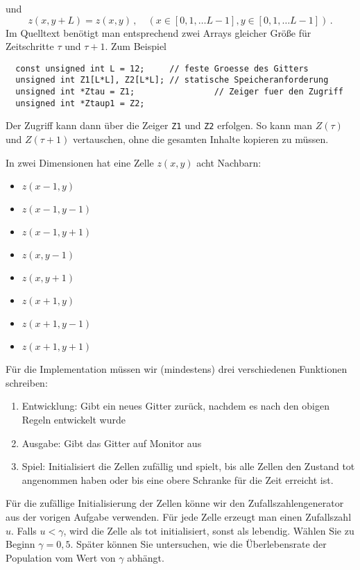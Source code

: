 \documentclass{article}[12pt]
\begin{document}
und
\begin{equation}
  z(x,y+L)= z(x, y)\,,\quad (x\in[0,1,\ldots L-1], y\in[0,1,\ldots L-1])\,.
\end{equation}
Im Quelltext benötigt man entsprechend zwei Arrays gleicher Größe für Zeitschritte $\tau$ und $\tau+1$.
Zum Beispiel
\begin{lstlisting}
  const unsigned int L = 12;     // feste Groesse des Gitters
  unsigned int Z1[L*L], Z2[L*L]; // statische Speicheranforderung
  unsigned int *Ztau = Z1;                // Zeiger fuer den Zugriff
  unsigned int *Ztaup1 = Z2;
\end{lstlisting}
Der Zugriff kann dann über die Zeiger \texttt{Z1} und \texttt{Z2} erfolgen.
So kann man $Z(\tau)$ und $Z(\tau+1)$ vertauschen, ohne die gesamten Inhalte kopieren zu müssen.

In zwei Dimensionen hat eine Zelle $z(x,y)$ acht Nachbarn:
\begin{itemize}
\item  $z(x-1,y)$
\item  $z(x-1,y-1)$
\item  $z(x-1,y+1)$
\item  $z(x,y-1)$
\item  $z(x,y+1)$
\item  $z(x+1,y)$
\item  $z(x+1,y-1)$
\item  $z(x+1,y+1)$
\end{itemize}
Für die Implementation müssen wir (mindestens) drei verschiedenen Funktionen schreiben:
\begin{enumerate}
\item Entwicklung: Gibt ein neues Gitter zurück, nachdem es nach den obigen Regeln entwickelt wurde
\item Ausgabe: Gibt das Gitter auf Monitor aus
\item Spiel: Initialisiert die Zellen zufällig und \glqq spielt\grqq, bis alle Zellen den Zustand tot angenommen haben oder bis eine obere Schranke für die Zeit erreicht ist.
\end{enumerate}
Für die zufällige Initialisierung der Zellen könne wir den Zufallszahlengenerator aus der vorigen Aufgabe verwenden.
Für jede Zelle erzeugt man einen Zufallszahl $u$.
Falls $u<\gamma$, wird die Zelle als tot initialisiert, sonst als lebendig.
Wählen Sie zu Beginn $\gamma=0,5$. 
Später können Sie untersuchen, wie die Überlebensrate der Population vom Wert von $\gamma$ abhängt.

\end{document}
